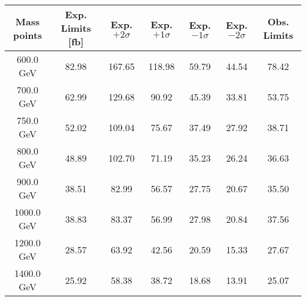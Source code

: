 
\begin{table}
\begin{center}
\begin{tabular}{c|cccccc}
\hline
\hline
Mass points & Exp. Limits [fb] & Exp. $+2\sigma$ & Exp. $+1\sigma$ &  Exp. $-1\sigma$  &  Exp. $-2\sigma$ & Obs. Limits \\
\hline
600.0 GeV  &  82.98  & 167.65  & 118.98  & 59.79  & 44.54   & 78.42\\
700.0 GeV  &  62.99  & 129.68  & 90.92  & 45.39  & 33.81   & 53.75\\
750.0 GeV  &  52.02  & 109.04  & 75.67  & 37.49  & 27.92   & 38.71\\
800.0 GeV  &  48.89  & 102.70  & 71.19  & 35.23  & 26.24   & 36.63\\
900.0 GeV  &  38.51  & 82.99  & 56.57  & 27.75  & 20.67   & 35.50\\
1000.0 GeV  &  38.83  & 83.37  & 56.99  & 27.98  & 20.84   & 37.56\\
1200.0 GeV  &  28.57  & 63.92  & 42.56  & 20.59  & 15.33   & 27.67\\
1400.0 GeV  &  25.92  & 58.38  & 38.72  & 18.68  & 13.91   & 25.07\\

\hline
\hline
\end{tabular}
\end{center}
\end{table}
